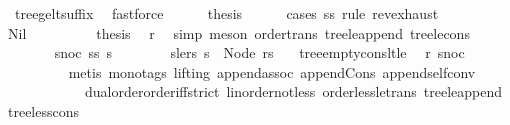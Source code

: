 \begin{isabellebody}
\ {}{\isacharparenleft}{\kern0pt}{}{\isacharparenright}{\kern0pt}\ tree{\isacharunderscore}{\kern0pt}ge{\isacharunderscore}{\kern0pt}lt{\isacharunderscore}{\kern0pt}suffix\ \isamarkupfalse%
\ fastforce\isanewline
\ \ \ \ \isamarkupfalse%
\ {\isacharquery}{\kern0pt}thesis\isanewline
\ \ \ \ \isamarkupfalse%
\ {\isacharparenleft}{\kern0pt}cases\ ss\ rule{\isacharcolon}{\kern0pt}\ rev{\isacharunderscore}{\kern0pt}exhaust{\isacharparenright}{\kern0pt}\isanewline
\ \ \ \ \ \ \isamarkupfalse%
\ Nil\isanewline
\ \ \ \ \ \ \isamarkupfalse%
\ \isamarkupfalse%
\ {\isacharquery}{\kern0pt}thesis\ \isamarkupfalse%
\ r\ \isamarkupfalse%
\ {\isacharparenleft}{\kern0pt}simp{\isacharcomma}{\kern0pt}\ meson\ order{\isacharunderscore}{\kern0pt}trans\ tree{\isacharunderscore}{\kern0pt}le{\isacharunderscore}{\kern0pt}append\ tree{\isacharunderscore}{\kern0pt}le{\isacharunderscore}{\kern0pt}cons{\isacharparenright}{\kern0pt}\isanewline
\ \ \ \ \isamarkupfalse%
\isanewline
\ \ \ \ \ \ \isamarkupfalse%
\ {\isacharparenleft}{\kern0pt}snoc\ ss{\isacharprime}{\kern0pt}\ s{\isacharprime}{\kern0pt}{\isacharparenright}{\kern0pt}\isanewline
\ \ \ \ \ \ \isamarkupfalse%
\ s{\isacharprime}{\kern0pt}{\isacharunderscore}{\kern0pt}le{\isacharunderscore}{\kern0pt}rs{\isacharcolon}{\kern0pt}\ {\isachardoublequoteopen}s{\isacharprime}{\kern0pt}\ {\isasymle}\ Node\ rs{\isachardoublequoteclose}\ \isamarkupfalse%
\ {}{\isacharparenleft}{\kern0pt}{}{\isacharparenright}{\kern0pt}\ tree{\isacharunderscore}{\kern0pt}empty{\isacharunderscore}{\kern0pt}cons{\isacharunderscore}{\kern0pt}lt{\isacharunderscore}{\kern0pt}le\ \isamarkupfalse%
\ r\ snoc\isanewline
\ \ \ \ \ \ \ \ \isamarkupfalse%
\ {\isacharparenleft}{\kern0pt}metis\ {\isacharparenleft}{\kern0pt}mono{\isacharunderscore}{\kern0pt}tags{\isacharcomma}{\kern0pt}\ lifting{\isacharparenright}{\kern0pt}\ append{\isachardot}{\kern0pt}assoc\ append{\isacharunderscore}{\kern0pt}Cons\ append{\isacharunderscore}{\kern0pt}self{\isacharunderscore}{\kern0pt}conv{}\isanewline
\ \ \ \ \ \ \ \ \ \ \ \ dual{\isacharunderscore}{\kern0pt}order{\isachardot}{\kern0pt}order{\isacharunderscore}{\kern0pt}iff{\isacharunderscore}{\kern0pt}strict\ linorder{\isacharunderscore}{\kern0pt}not{\isacharunderscore}{\kern0pt}less\ order{\isacharunderscore}{\kern0pt}less{\isacharunderscore}{\kern0pt}le{\isacharunderscore}{\kern0pt}trans\ tree{\isacharunderscore}{\kern0pt}le{\isacharunderscore}{\kern0pt}append\ tree{\isacharunderscore}{\kern0pt}less{\isacharunderscore}{\kern0pt}cons{}{\isacharparenright}{\kern0pt}\isanewline

\end{isabellebody}
